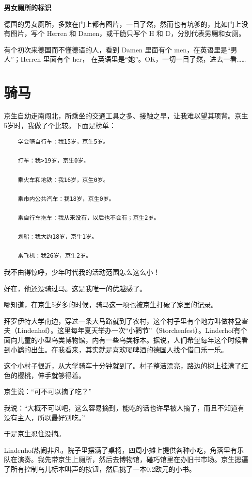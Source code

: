 \documentclass[twoside,openright,headings=optiontohead]{ctexbook} %
\begin{document}
{\textbf{男女厕所的标识}

德国的男女厕所，多数在门上都有图片，一目了然，然而也有坑爹的，比如门上没有图片，写个
Herren 和 Damen，或干脆只写个 H 和 D，分别代表男厕和女厕。

有个初次来德国而不懂德语的人，看到 Damen 里面有个
men，在英语里是``男人''；Herren 里面有个 her，
在英语里是``她''。OK，一切一目了然，进去一看\ldots{}\ldots{}

\chapter*{骑马}\label{horse-riding}

京生自幼走南闯北，所乘坐的交通工具之多、接触之早，让我难以望其项背。京生5岁时，我做了个比较。下面是榜单：

\begin{verbatim}
    学会骑自行车：我15岁，京生5岁。

    打车：我>19岁，京生0岁。

    乘火车和地铁：我16岁，京生0岁。

    乘市内公共汽车：我18岁，京生0岁。

    乘自行车拖车：我从来没有，以后也不会有；京生2岁。

    划船：我大约18岁，京生1岁。

    乘飞机：我26岁，京生2岁。
\end{verbatim}

我不由得惊呼，少年时代我的活动范围怎么这么小！

好在，他还没骑过马。这是我唯一的优越感了。

哪知道，在京生5岁多的时候，骑马这一项也被京生打破了家里的记录。

拜罗伊特大学南边，穿过一条大马路就到了农村，这个村子里有个地方叫做林登霍夫（Lindenhof）。这里每年夏天举办一次``小鹳节''（Storchenfest）。Linderhof有个面向儿童的小型鸟类博物馆，内有一些鸟类标本。据说，人们希望每年这个时候看到小鹳的出生。在我看来，其实就是喜欢喝啤酒的德国人找个借口乐一乐。

这个小村子很近，从大学骑车十分钟就到了。村子整洁漂亮，路边的树上挂满了红色的樱桃，伸手就够得着。

京生说：``可不可以摘了吃？''

我说：``大概不可以吧，这么容易摘到，能吃的话也许早被人摘了，而且不知道有没有主人，所以最好别吃。''

于是京生忍住没摘。

Lindenhof热闹非凡，院子里摆满了桌椅，四周小摊上提供各种小吃，角落里有乐队在演奏。我先带京生上厕所，然后去博物馆，碰巧馆里在办旧书市场。京生摁遍了所有控制鸟儿标本叫声的按钮，然后挑了一本0.2欧元的小书。

}
\end{document}
